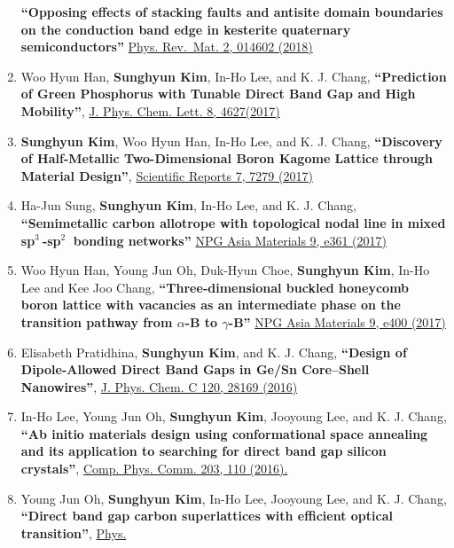 \begin{enumerate}
  \textbf{``Opposing effects of stacking faults and antisite domain
  boundaries on the conduction band edge in kesterite quaternary
  semiconductors''}
  \href{https://journals.aps.org/prmaterials/abstract/10.1103/PhysRevMaterials.2.014602}{Phys.
  Rev.~Mat. 2, 014602 (2018)}
\item
  Woo Hyun Han, \textbf{Sunghyun Kim}, In-Ho Lee, and K. J. Chang,
  \textbf{``Prediction of Green Phosphorus with Tunable Direct Band Gap
  and High Mobility''},
  \href{https://pubs.acs.org/doi/10.1021/acs.jpclett.7b02153}{J. Phys.
  Chem. Lett. 8, 4627(2017)}
\item
  \textbf{Sunghyun Kim}, Woo Hyun Han, In-Ho Lee, and K. J. Chang,
  \textbf{``Discovery of Half-Metallic Two-Dimensional Boron Kagome
  Lattice through Material Design''},
  \href{https://www.nature.com/articles/s41598-017-07518-9}{Scientific
  Reports 7, 7279 (2017)}
\item
  Ha-Jun Sung, \textbf{Sunghyun Kim}, In-Ho Lee, and K. J. Chang,
  \textbf{``Semimetallic carbon allotrope with topological nodal line in
  mixed sp\(^3~\)-sp\(^2~\) bonding networks''}
  \href{http://www.nature.com/am/journal/v9/n3/full/am201726a.html}{NPG
  Asia Materials 9, e361 (2017)}
\item
  Woo Hyun Han, Young Jun Oh, Duk-Hyun Choe, \textbf{Sunghyun Kim},
  In-Ho Lee and Kee Joo Chang, \textbf{``Three-dimensional buckled
  honeycomb boron lattice with vacancies as an intermediate phase on the
  transition pathway from \(\alpha\)-B to \(\gamma\)-B''}
  \href{http://www.nature.com/am/journal/v9/n7/full/am201798a.html}{NPG
  Asia Materials 9, e400 (2017)}
\item
  Elisabeth Pratidhina, \textbf{Sunghyun Kim}, and K. J. Chang,
  \textbf{``Design of Dipole-Allowed Direct Band Gaps in Ge/Sn
  Core--Shell Nanowires''},
  \href{http://pubs.acs.org/doi/abs/10.1021/acs.jpcc.6b08779}{J. Phys.
  Chem. C 120, 28169 (2016)}
\item
  In-Ho Lee, Young Jun Oh, \textbf{Sunghyun Kim}, Jooyoung Lee, and K.
  J. Chang, \textbf{``Ab initio materials design using conformational
  space annealing and its application to searching for direct band gap
  silicon crystals''},
  \href{http://dx.doi.org/10.1016/j.cpc.2016.02.011}{Comp. Phys. Comm.
  203, 110 (2016).}
\item
  Young Jun Oh, \textbf{Sunghyun Kim}, In-Ho Lee, Jooyoung Lee, and K.
  J. Chang, \textbf{``Direct band gap carbon superlattices with
  efficient optical transition''},
  \href{http://journals.aps.org/prb/abstract/10.1103/PhysRevB.93.085201}{Phys.
}
\end{enumerate}
